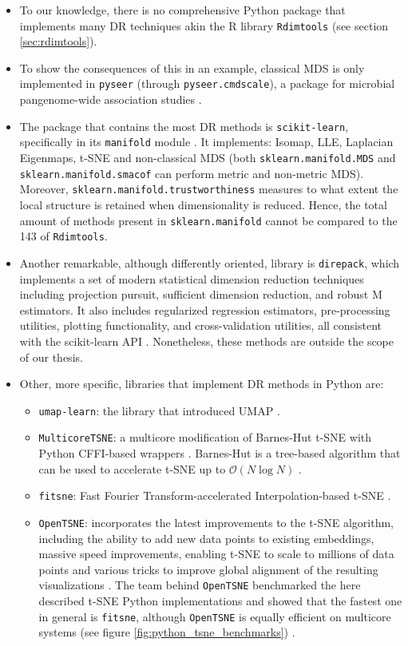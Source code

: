 \documentclass[a4paper,12pt]{article}
\begin{document}
\begin{itemize}
    \item To our knowledge, there is no comprehensive Python package that implements many DR techniques akin the R library \texttt{Rdimtools} (see section \ref{sec:rdimtools}).
    \item To show the consequences of this in an example, classical MDS is only implemented in \texttt{pyseer} (through \texttt{pyseer.cmdscale}), a package for microbial pangenome-wide association studies \cite{pyseer}.
    \item The package that contains the most DR methods is \texttt{scikit-learn}, specifically in its \texttt{manifold} module \cite{pedregosa2011scikit}. It implements: Isomap, LLE, Laplacian Eigenmaps, t-SNE and non-classical MDS (both \texttt{sklearn.manifold.MDS} and \texttt{sklearn.manifold.smacof} can perform metric and non-metric MDS). Moreover, \texttt{sklearn.manifold.trustworthiness} measures to what extent the local structure is retained when dimensionality is reduced. Hence, the total amount of methods present in \texttt{sklearn.manifold} cannot be compared to the 143 of \texttt{Rdimtools}.
    \item Another remarkable, although differently oriented, library is \texttt{direpack}, which implements a set of modern statistical dimension reduction techniques including projection pursuit, sufficient dimension reduction, and robust M estimators. It also includes regularized regression estimators, pre-processing utilities, plotting functionality, and cross-validation utilities, all consistent with the scikit-learn API \cite{direpack}. Nonetheless, these methods are outside the scope of our thesis.
    \item Other, more specific, libraries that implement DR methods in Python are:
    \begin{itemize}
        \item \texttt{umap-learn}: the library that introduced UMAP \cite{2018arXivUMAP}.
        \item \texttt{MulticoreTSNE}: a multicore modification of Barnes-Hut t-SNE with Python CFFI-based wrappers \cite{Ulyanov2016}. Barnes-Hut is a tree-based algorithm that can be used to accelerate t-SNE up to $\mathcal{O}(N\log N)$ \cite{JMLR:v15:vandermaaten14a}.
        \item \texttt{fitsne}: Fast Fourier Transform-accelerated Interpolation-based t-SNE \cite{fitsne}.
        \item \texttt{OpenTSNE}: incorporates the latest improvements to the t-SNE algorithm, including the ability to add new data points to existing embeddings, massive speed improvements, enabling t-SNE to scale to millions of data points and various tricks to improve global alignment of the resulting visualizations \cite{Policar2024}. The team behind \texttt{OpenTSNE} benchmarked the here described t-SNE Python implementations and showed that the fastest one in general is \texttt{fitsne}, although \texttt{OpenTSNE} is equally efficient on multicore systems (see figure \ref{fig:python_tsne_benchmarks}) \cite{Policar2024}.

\end{itemize}
\end{itemize}
\end{document}

